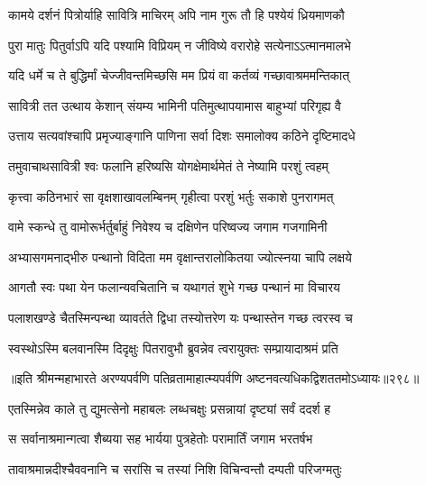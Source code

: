 \begin{center}



\twolineshloka
{कामये दर्शनं पित्रोर्याहि सावित्रि माचिरम्}
{अपि नाम गुरू तौ हि  पश्येयं ध्रियमाणकौ}


\twolineshloka
{पुरा मातुः पितुर्वाऽपि यदि पश्यामि विप्रियम्}
{न जीविष्ये वरारोहे सत्येनाऽऽत्मानमालभे}


\twolineshloka
{यदि धर्मे च ते बुद्धिर्मां चेज्जीवन्तमिच्छसि}
{मम प्रियं वा कर्तव्यं गच्छावाश्रममन्तिकात्}




\twolineshloka
{सावित्री तत उत्थाय केशान् संयम्य भामिनी}
{पतिमुत्थापयामास बाहुभ्यां परिगृह्य वै}


\twolineshloka
{उत्ताय सत्यवांश्चापि प्रमृज्याङ्गानि पाणिना}
{सर्वा दिशः समालोक्य कठिने दृष्टिमादधे}


\twolineshloka
{तमुवाचाथसावित्री श्वः फलानि हरिष्यसि}
{योगक्षेमार्थमेतं ते नेष्यामि परशुं त्वहम्}


\twolineshloka
{कृत्त्वा कठिनभारं सा वृक्षशाखावलम्बिनम्}
{गृहीत्वा परशुं भर्तुः सकाशे पुनरागमत्}


\twolineshloka
{वामे स्कन्धे तु वामोरूर्भर्तुर्बाहुं निवेश्य च}
{दक्षिणेन परिष्वज्य जगाम गजगामिनी}




\twolineshloka
{अभ्यासगमनाद्भीरु पन्थानो विदिता मम}
{वृक्षान्तरालोकितया ज्योत्स्नया चापि लक्षये}


\twolineshloka
{आगतौ स्वः पथा येन फलान्यवचितानि च}
{यथागतं शुभे गच्छ पन्थानं मा विचारय}


\twolineshloka
{पलाशखण्डे चैतस्मिन्पन्था व्यावर्तते द्विधा}
{तस्योत्तरेण यः पन्थास्तेन गच्छ त्वरस्व च}


\twolineshloka
{स्वस्थोऽस्मि बलवानस्मि दिदृक्षुः पितरावुभौ}
{ब्रुवन्नेव त्वरायुक्तः सम्प्रायादाश्रमं प्रति}


॥इति श्रीमन्महाभारते अरण्यपर्वणि
पतिव्रतामाहात्म्यपर्वणि अष्टनवत्यधिकद्विशततमोऽध्यायः॥२९८॥




\twolineshloka
{एतस्मिन्नेव काले तु द्युमत्सेनो महाबलः}
{लब्धचक्षुः प्रसन्नायां दृष्ट्यां सर्वं ददर्श ह}


\twolineshloka
{स सर्वानाश्रमान्गत्वा शैब्यया सह भार्यया}
{पुत्रहेतोः परामार्तिं जगाम भरतर्षभ}


\twolineshloka
{तावाश्रमान्नदीश्चैववनानि च सरांसि च}
{तस्यां निशि विचिन्वन्तौ दम्पती परिजग्मतुः}



\end{center}
